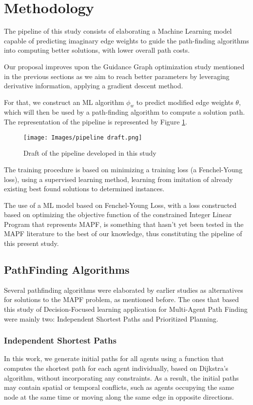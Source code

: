 \section{Methodology}

The pipeline of this study consists of elaborating a Machine Learning model capable of predicting imaginary edge weights to guide the path-finding algorithms into computing better solutions, with lower overall path costs.

Our proposal improves upon the Guidance Graph optimization study mentioned in the previous sections as we aim to reach better parameters by leveraging derivative information, applying a gradient descent method.

For that, we construct an ML algorithm $\phi_w$ to predict modified edge weights $\theta$, which will then be used by a path-finding algorithm to compute a solution path. The representation of the pipeline is represented by Figure \ref{fig:draft-pipeline}.

\begin{figure}
    \centering
    \texttt{[image: Images/pipeline draft.png]}
    \caption{Draft of the pipeline developed in this study}
    \label{fig:draft-pipeline}
\end{figure}

The training procedure is based on minimizing a training loss (a Fenchel-Young loss), using a supervised learning method, learning from imitation of already existing best found solutions to determined instances.

The use of a ML model based on Fenchel-Young Loss, with a loss constructed based on optimizing the objective function of the constrained Integer Linear Program that represents MAPF, is something that hasn't yet been tested in the MAPF literature to the best of our knowledge, thus constituting the pipeline of this present study.

\subsection{PathFinding Algorithms}
Several pathfinding algorithms were elaborated by earlier studies as alternatives for solutions to the MAPF problem, as mentioned before. The ones that based this study of Decision-Focused learning application for Multi-Agent Path Finding were mainly two: Independent Shortest Paths and Prioritized Planning.

\subsubsection{Independent Shortest Paths}
In this work, we generate initial paths for all agents using a function that computes the shortest path for each agent individually, based on Dijkstra’s algorithm, without incorporating any constraints. As a result, the initial paths may contain spatial or temporal conflicts, such as agents occupying the same node at the same time or moving along the same edge in opposite directions.

